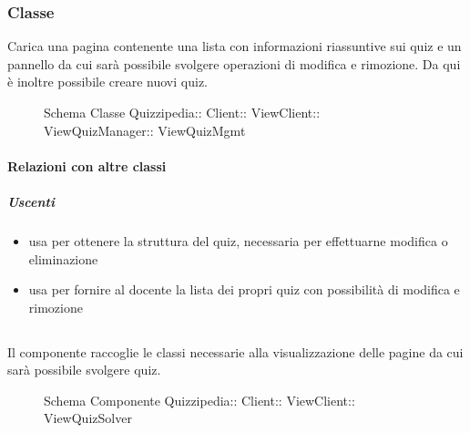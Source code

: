 \subsubsection{Classe }
Carica una pagina contenente una lista con informazioni riassuntive sui quiz e un pannello da cui sarà possibile svolgere operazioni di modifica e rimozione. Da qui è inoltre possibile creare nuovi quiz.
\begin{figure}[H]
\centering
\noindent{}
\caption[Schema Classe ViewQuizMgmt]{Schema Classe Quizzipedia:: Client:: ViewClient:: ViewQuizManager:: ViewQuizMgmt}
\end{figure}
\paragraph{Relazioni con altre classi}
\subparagraph{Uscenti}
\begin{itemize}
\item usa  per ottenere la struttura del quiz, necessaria per effettuarne modifica o eliminazione
\item usa  per fornire al docente la lista dei propri quiz con possibilità di modifica e rimozione
\end{itemize}
\subsection{}
Il componente raccoglie le classi necessarie alla visualizzazione delle pagine da cui sarà possibile svolgere quiz.
\begin{figure}[H]
\centering
\noindent{}
\caption[Schema Componente ViewQuizSolver]{Schema Componente Quizzipedia:: Client:: ViewClient:: ViewQuizSolver}
\end{figure}
